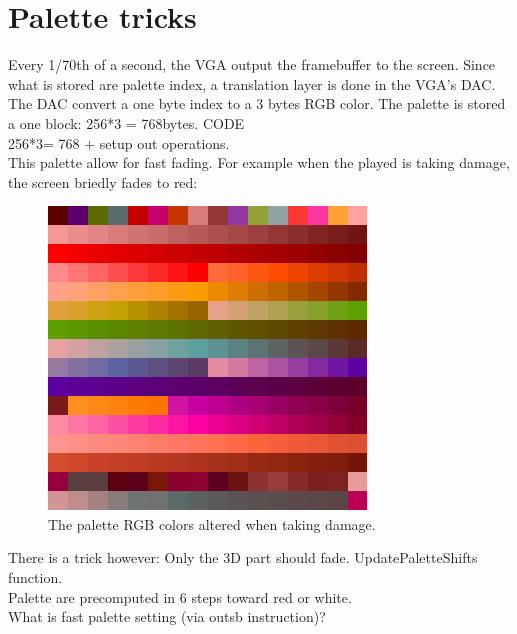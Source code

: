 






\section{Palette tricks}

Every 1/70th of a second, the VGA output the framebuffer to the screen. Since what is stored are palette index, a translation layer is done in the VGA's DAC. The DAC convert a one byte index to a 3 bytes RGB color. The palette is stored a one block: 256*3 = 768bytes. 
CODE\\
256*3= 768 + setup out operations.\\
This palette allow for fast fading. For example when the played is taking damage, the screen briedly fades to red:
\begin{figure}[H]
  \centering
 \includegraphics[width=\textwidth]{imgs/palette_damage.png}
 \caption{The palette RGB colors altered when taking damage.} \label{fig:palette_damage}
\end{figure}
There is a trick however: Only the 3D part should fade. UpdatePaletteShifts function.\\
Palette are precomputed in 6 steps toward red or white.\\
What is fast palette setting (via outsb instruction)?\\

